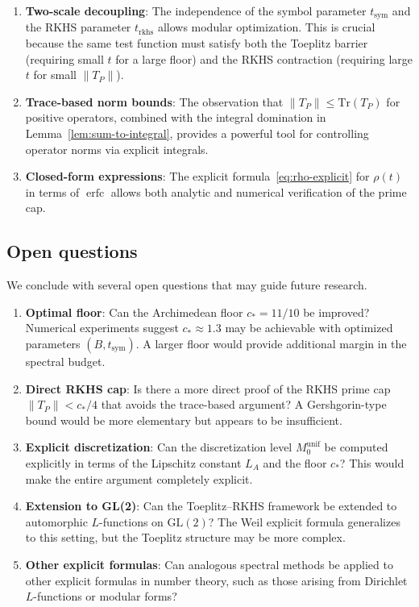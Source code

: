 \documentclass[11pt,a4paper]{article}
\theoremstyle{definition}
\theoremstyle{remark}
\DeclareMathOperator{\erfc}{erfc}
\begin{document}
\begin{enumerate}
\item \textbf{Two-scale decoupling}: The independence of the symbol parameter $t_{\mathrm{sym}}$ and the RKHS parameter $t_{\mathrm{rkhs}}$ allows modular optimization. This is crucial because the same test function must satisfy both the Toeplitz barrier (requiring small $t$ for a large floor) and the RKHS contraction (requiring large $t$ for small $\|T_P\|$).

\item \textbf{Trace-based norm bounds}: The observation that $\|T_P\| \leq \mathrm{Tr}(T_P)$ for positive operators, combined with the integral domination in Lemma~\ref{lem:sum-to-integral}, provides a powerful tool for controlling operator norms via explicit integrals.

\item \textbf{Closed-form expressions}: The explicit formula~\eqref{eq:rho-explicit} for $\rho(t)$ in terms of $\erfc$ allows both analytic and numerical verification of the prime cap.
\end{enumerate}

\subsection{Open questions}

We conclude with several open questions that may guide future research.

\begin{enumerate}
\item \textbf{Optimal floor}: Can the Archimedean floor $c_* = 11/10$ be improved? Numerical experiments suggest $c_* \approx 1.3$ may be achievable with optimized parameters $(B, t_{\mathrm{sym}})$. A larger floor would provide additional margin in the spectral budget.

\item \textbf{Direct RKHS cap}: Is there a more direct proof of the RKHS prime cap $\|T_P\| < c_*/4$ that avoids the trace-based argument? A Gershgorin-type bound would be more elementary but appears to be insufficient.

\item \textbf{Explicit discretization}: Can the discretization level $M_0^{\mathrm{unif}}$ be computed explicitly in terms of the Lipschitz constant $L_A$ and the floor $c_*$? This would make the entire argument completely explicit.

\item \textbf{Extension to GL(2)}: Can the Toeplitz--RKHS framework be extended to automorphic $L$-functions on $\mathrm{GL}(2)$? The Weil explicit formula generalizes to this setting, but the Toeplitz structure may be more complex.

\item \textbf{Other explicit formulas}: Can analogous spectral methods be applied to other explicit formulas in number theory, such as those arising from Dirichlet $L$-functions or modular forms?
\end{enumerate}
\end{document}
